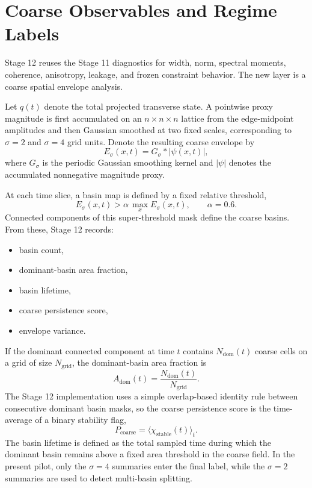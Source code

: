 \documentclass[11pt]{article}
\begin{document}
\section{Coarse Observables and Regime Labels}
Stage 12 reuses the Stage 11 diagnostics for width, norm, spectral moments, coherence, anisotropy, leakage, and frozen constraint behavior. The new layer is a coarse spatial envelope analysis.

Let $q(t)$ denote the total projected transverse state. A pointwise proxy magnitude is first accumulated on an $n\times n\times n$ lattice from the edge-midpoint amplitudes and then Gaussian smoothed at two fixed scales, corresponding to $\sigma=2$ and $\sigma=4$ grid units. Denote the resulting coarse envelope by
\begin{equation}
E_{\sigma}(x,t) = G_{\sigma} * |\psi(x,t)|,
\end{equation}
where $G_{\sigma}$ is the periodic Gaussian smoothing kernel and $|\psi|$ denotes the accumulated nonnegative magnitude proxy.

At each time slice, a basin map is defined by a fixed relative threshold,
\begin{equation}
E_{\sigma}(x,t) > \alpha\, \max_x E_{\sigma}(x,t),
\qquad \alpha = 0.6.
\end{equation}
Connected components of this super-threshold mask define the coarse basins. From these, Stage 12 records:
\begin{itemize}
\item basin count,
\item dominant-basin area fraction,
\item basin lifetime,
\item coarse persistence score,
\item envelope variance.
\end{itemize}

If the dominant connected component at time $t$ contains $N_{\mathrm{dom}}(t)$ coarse cells on a grid of size $N_{\mathrm{grid}}$, the dominant-basin area fraction is
\begin{equation}
A_{\mathrm{dom}}(t) = \frac{N_{\mathrm{dom}}(t)}{N_{\mathrm{grid}}}.
\end{equation}
The Stage 12 implementation uses a simple overlap-based identity rule between consecutive dominant basin masks, so the coarse persistence score is the time-average of a binary stability flag,
\begin{equation}
P_{\mathrm{coarse}} = \langle \chi_{\mathrm{stable}}(t) \rangle_t.
\end{equation}
The basin lifetime is defined as the total sampled time during which the dominant basin remains above a fixed area threshold in the coarse field. In the present pilot, only the $\sigma=4$ summaries enter the final label, while the $\sigma=2$ summaries are used to detect multi-basin splitting.
\end{document}
